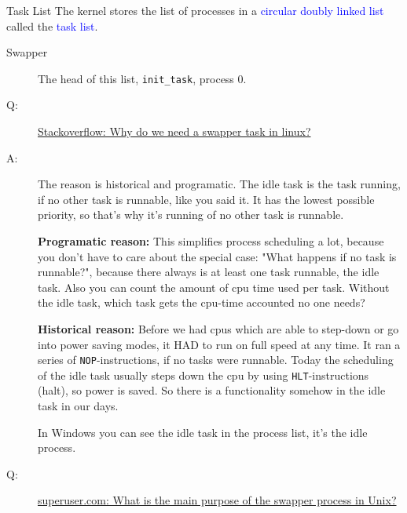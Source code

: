 \begin{frame}{Task List}
  The kernel stores the list of processes in a \textcolor{blue}{circular doubly linked
    list} called the \textcolor{blue}{task list}.
  \begin{description}
  \item[Swapper] The head of this list, \texttt{init\_task}, process 0.
  \end{description}
  \begin{center}
  \end{center}
\end{frame}

\begin{description}
\item[Q:]
  \href{http://stackoverflow.com/questions/464483/why-do-we-need-a-swapper-task-in-linux}{%
    Stackoverflow: Why do we need a swapper task in linux?}
\item[A:] The reason is historical and programatic. The idle task is the task running, if
  no other task is runnable, like you said it. It has the lowest possible priority, so
  that's why it's running of no other task is runnable.

  \textbf{Programatic reason:} This simplifies process scheduling a lot, because you don't
  have to care about the special case: "What happens if no task is runnable?", because
  there always is at least one task runnable, the idle task. Also you can count the amount
  of cpu time used per task. Without the idle task, which task gets the cpu-time accounted
  no one needs?

  \textbf{Historical reason:} Before we had cpus which are able to step-down or go into
  power saving modes, it HAD to run on full speed at any time. It ran a series of
  \texttt{NOP}-instructions, if no tasks were runnable. Today the scheduling of the idle
  task usually steps down the cpu by using \texttt{HLT}-instructions (halt), so power is
  saved. So there is a functionality somehow in the idle task in our days.

  In Windows you can see the idle task in the process list, it's the idle process.
  
\item[Q:] \href{http://superuser.com/questions/377572/swapper-process}{%
    superuser.com: What is the main purpose of the swapper process in Unix?}


\end{description}
